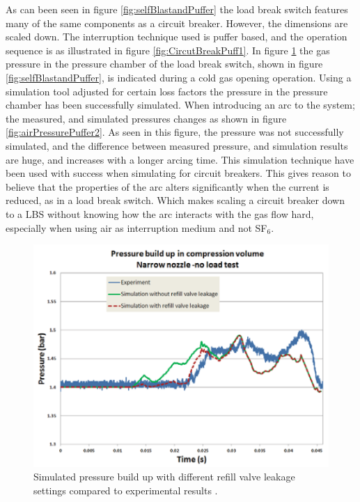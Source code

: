 \documentclass[10pt,a4paper,twoside]{article}
\begin{document}
As can been seen in figure \ref{fig:selfBlastandPuffer} the load break switch features many of the same components as a circuit breaker. However, the dimensions are scaled down. The interruption technique used is puffer based, and the operation sequence is as illustrated in figure \ref{fig:CircutBreakPuff1}. In figure \ref{fig:airPressurePuffer} the gas pressure in the pressure chamber of the load break switch, shown in figure \ref{fig:selfBlastandPuffer}, is indicated during a cold gas opening operation. Using a simulation tool adjusted for certain loss factors the pressure in the pressure chamber has been successfully simulated. When introducing an arc to the system; the measured, and simulated pressures changes as shown in figure \ref{fig:airPressurePuffer2}. As seen in this figure, the pressure was not successfully simulated, and the difference between measured pressure, and simulation results are huge, and increases with a longer arcing time. This simulation technique have been used with success when simulating for circuit breakers.  This gives reason to believe that the properties of the arc alters significantly when the current is reduced, as in a load break switch. Which makes scaling a circuit breaker down to a LBS without knowing how the arc interacts with the gas flow hard, especially when using air as interruption medium and not SF$_6$.
 
\begin{figure} [H]
\centering
\includegraphics[scale=0.5]{Bilder/Theory/tankPressure.png}
\caption{Simulated pressure build up with different refill valve leakage settings compared to experimental results  \cite{bib:CBAC}.} \label{fig:airPressurePuffer}
\end{figure}
\end{document}

